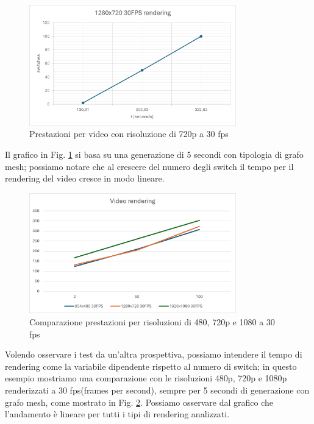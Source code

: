 \documentclass[binding=0.6cm]{sapthesis}
\begin{document}
\begin{figure}[h]
    \centering
    \includegraphics[width=0.8\textwidth]{immagini/720p_rendering_performance.png}
    \caption{Prestazioni per video con risoluzione di 720p a 30 fps}
    \label{fig:720p_rendering_performance}
\end{figure}

Il grafico in Fig. \ref{fig:720p_rendering_performance} si basa su una generazione di 5 secondi con tipologia di grafo mesh; possiamo notare che al
crescere del numero degli switch il tempo per il rendering del video cresce in modo lineare.


\begin{figure}[h]
    \centering
    \includegraphics[width=0.8\textwidth]{immagini/480_720_1080_rend_perf.png}
    \caption{Comparazione prestazioni per risoluzioni di 480, 720p e 1080 a 30 fps}
    \label{fig:480_720_1080_rend_perf}
\end{figure}

Volendo osservare i test da un'altra prospettiva, possiamo intendere il tempo di rendering come la variabile dipendente rispetto al numero di switch; in questo
esempio mostriamo una comparazione con le risoluzioni 480p, 720p e 1080p renderizzati a 30 fps(frames per second),
 sempre per 5 secondi di generazione con grafo mesh, come mostrato in Fig. \ref{fig:480_720_1080_rend_perf}. Possiamo osservare dal grafico che l'andamento è lineare per tutti i tipi di rendering analizzati.
\end{document}
